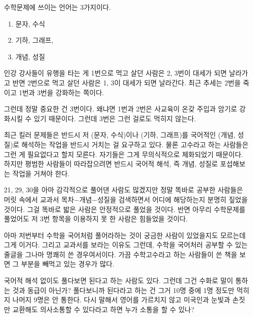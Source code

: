 수학문제에 쓰이는 언어는 3가지이다.
\vspace{5mm}

\begin{enumerate}
    \item 문자, 수식
    \item 기하, 그래프,
    \item 개념, 성질
\end{enumerate}
\vspace{5mm}

인강 강사들이 유행을 타는 게 1번으로 먹고 살던 사람은 2, 3번이 대세가 되면 날라가고
반면 2번으로 먹고 살던 사람은 1, 3이 대세가 되면 날라간다.
최근 추세는 2번을 죽이고 1번과 3번을 강화하는 쪽이다.
\vspace{5mm}

그런데 정말 중요한 건 3번이다.
왜냐면 1번과 2번은 사교육이 온갖 주입과 암기로 강화시킬 수 있기 때문이다.
그런데 3번은 그런 걸로도 먹히지 않는다.
\vspace{5mm}

최근 킬러 문제들은 반드시 저 (문자, 수식)이나 (기하, 그래프)를
국어적인 (개념, 성질)로 해석하는 작업을 반드시 거치는 걸 요구하고 있다.
물론 고수라고 하는 사람들은 그런 게 필요없다고 할지 모른다. 자기들은 그게 무의식적으로 체화되었기 때문이다.
하지만 평범한 사람들이 따라잡으려면 반드시 국어적 해석, 즉 개념, 성질로 포섭해보는 작업을 거쳐야 한다.
\vspace{5mm}

21, 29, 30을 아마 감각적으로 풀어댄 사람도 많겠지만
정말 똑바로 공부한 사람들은 머릿 속에서 교과서 목차$-$개념$-$성질을 검색하면서 어디에 해당하는지 분명히 짚었을 것이다.
그걸 똑바로 밟은 사람은 안정적으로 풀었을 것이다.
반면 아무리 수학문제를 풀었어도 저 3번 항목을 이용하지 못 한 사람은 힘들었을 것이다.
\vspace{5mm}

아마 저번부터 수학을 국어처럼 풀어라하는 것이 궁금한 사람이 있었을지도 모르는데 그게 이거다.
그리고 교과서를 보라는 이유도 그런데, 수학을 국어처러 공부할 수 있는 줄글을 그나마 명쾌히 쓴 경우여서이다.
가끔 수학고수라고 하는 사람들이 쓴 책을 보면 그 부분을 빼먹고 있는 경우가 많다.
\vspace{5mm}

국어적 해석 없이도 풀다보면 된다고 하는 사람도 있다. 그런데 그건 수화로 말이 통하는 것과 동급이 아닌가?
풀다보니까 된다라고 하는 건 그거 10명 중에 1명 정도만 먹히지 나머지 9명은 안 통한다.
다시 말해서 영어를 가르치지 않고 미국인과 눈빛과 손짓만 교환해도 의사소통할 수 있다라고 하면 누가 소통을 할 수 있나?
\vspace{5mm}

